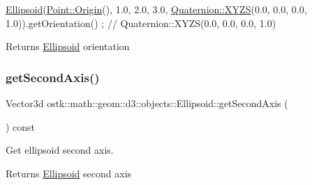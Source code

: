 \begin{DoxyCode}
\hyperlink{classostk_1_1math_1_1geom_1_1d3_1_1objects_1_1_ellipsoid_acd84276f65a14db12623402a411712b7}{Ellipsoid}(\hyperlink{classostk_1_1math_1_1geom_1_1d3_1_1objects_1_1_point_a079c199f08b015d456d02728a71b534c}{Point::Origin}(), 1.0, 2.0, 3.0, \hyperlink{classostk_1_1math_1_1geom_1_1d3_1_1trf_1_1rot_1_1_quaternion_ac57ea57a4033622ed1389101b2e58c76}{Quaternion::XYZS}(0.0, 0.0, 
      0.0, 1.0)).getOrientation() ; \textcolor{comment}{// Quaternion::XYZS(0.0, 0.0, 0.0, 1.0)}
\end{DoxyCode}


\begin{DoxyReturn}{Returns}
\hyperlink{classostk_1_1math_1_1geom_1_1d3_1_1objects_1_1_ellipsoid}{Ellipsoid} orientation 
\end{DoxyReturn}
\mbox{\label{classostk_1_1math_1_1geom_1_1d3_1_1objects_1_1_ellipsoid_a9a694ec8f31e617d4101bd31fa1519a0}} 
\subsubsection{\texorpdfstring{get\+Second\+Axis()}{getSecondAxis()}}
{\footnotesize\ttfamily Vector3d ostk\+::math\+::geom\+::d3\+::objects\+::\+Ellipsoid\+::get\+Second\+Axis (\begin{DoxyParamCaption}{ }\end{DoxyParamCaption}) const}



Get ellipsoid second axis. 

\begin{DoxyReturn}{Returns}
\hyperlink{classostk_1_1math_1_1geom_1_1d3_1_1objects_1_1_ellipsoid}{Ellipsoid} second axis 
\end{DoxyReturn}
\mbox{\label{classostk_1_1math_1_1geom_1_1d3_1_1objects_1_1_ellipsoid_a628df5e41c5b24722c74b54f604788da}} 
